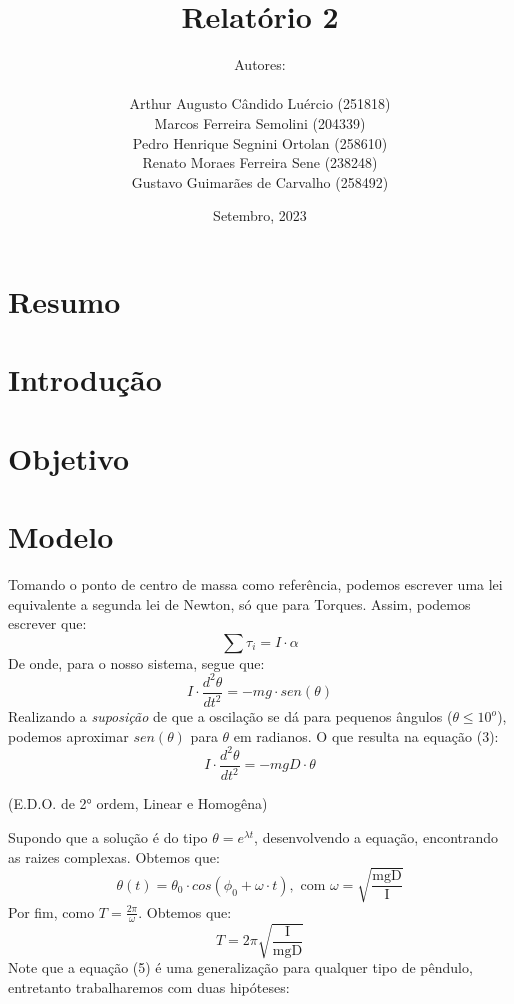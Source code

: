 \documentclass[a4paper]{report}
\title{\huge
{\textbf{Relatório 2}}
 \\
\fontsize{30pt}{36pt}\selectfont{\textbf{O Pêndulo Físico}}
}
\author{
Autores:\\ \ \\
Arthur Augusto Cândido Luércio (251818) \\
Marcos Ferreira Semolini (204339) \\
Pedro Henrique Segnini Ortolan (258610) \\
Renato Moraes Ferreira Sene (238248) \\
Gustavo Guimarães de Carvalho (258492)
}
\date{Setembro, 2023}
\begin{document}
\pagestyle{fancy}
\fancyfoot{}\fancyhead{}
\maketitle{}
\pagebreak
{}
\fancyfoot[R]{\thepage}
\section*{Resumo}
\section*{Introdução}
\section*{Objetivo}
\section*{Modelo}
\qquad Tomando o ponto de centro de massa como referência, 
podemos escrever uma lei equivalente a segunda lei de Newton, só que para Torques.
Assim, podemos escrever que:
\begin{equation}
    \sum{\tau_i} =  I\cdot \alpha
\end{equation}
\qquad De onde, para o nosso sistema, segue que:
\begin{equation}
    I \cdot \frac{d^2\theta}{dt ^2} = - mg\cdot sen(\theta)
\end{equation}
\qquad Realizando a \textit{suposição} de que a oscilação se dá para pequenos ângulos
($\theta \leq 10^{o} $), podemos aproximar $sen(\theta)$ para $\theta$ em radianos.
O que resulta na equação (3):
\begin{equation}
    I \cdot \frac{d^2\theta}{dt ^2} = - mgD\cdot \theta
\end{equation}
\begin{center}
    \small{(E.D.O. de 2° ordem, Linear e Homogêna)}
\end{center}
\qquad Supondo que a solução é do tipo $\theta = e^{\lambda t}$, desenvolvendo
a equação, encontrando as raizes complexas. Obtemos que:
\begin{equation}
    \theta(t) = \theta_0 \cdot cos(\phi_0 + \omega \cdot t), \text{ com } \omega = \sqrt{\frac{\text{mgD}}{\text{I}}}
\end{equation}
\qquad Por fim, como $T = \frac{2\pi}{\omega}$. Obtemos que:
\begin{equation}
    T = 2\pi \sqrt{\frac{\text{I}}{\text{mgD}}}
\end{equation}
\qquad Note que a equação (5) é uma generalização para qualquer
tipo de pêndulo, entretanto trabalharemos com duas hipóteses:
\end{document}
